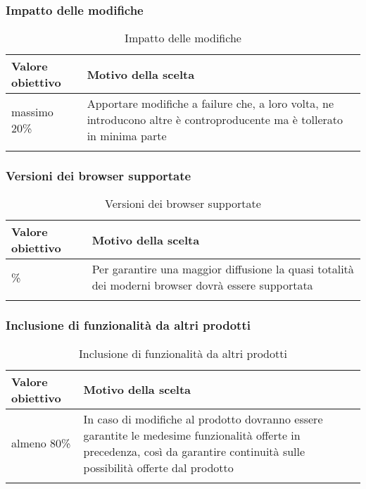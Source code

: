 \documentclass[../PianoDiQualifica_v4.0.0.tex]{subfiles}
\begin{document}
		\subsubsection{Impatto delle modifiche}
			\begin{longtable}[c] { >{\centering\arraybackslash}p{4cm} p{7cm} }
				\toprule
				\centerline{\textbf{Valore obiettivo}} & \centerline{\textbf{Motivo della scelta}} \\
				\midrule
					massimo 20\% & Apportare modifiche a failure che, a loro volta, ne introducono altre è controproducente ma è tollerato in minima parte \\
				\bottomrule
				\caption{Impatto delle modifiche}
			\end{longtable}

		\subsubsection{Versioni dei browser supportate}
			\begin{longtable}[c] { >{\centering\arraybackslash}p{4cm} p{7cm} }
				\toprule
				\centerline{\textbf{Valore obiettivo}} & \centerline{\textbf{Motivo della scelta}} \\
				\midrule
					95\% &	Per garantire una maggior diffusione la quasi totalità dei moderni browser dovrà essere supportata \\
				\bottomrule
				\caption{Versioni dei browser supportate}
			\end{longtable}

		\subsubsection{Inclusione di funzionalità da altri prodotti}
			\begin{longtable}[c] { >{\centering\arraybackslash}p{4cm} p{7cm} }
				\toprule
				\centerline{\textbf{Valore obiettivo}} & \centerline{\textbf{Motivo della scelta}} \\
				\midrule
					almeno 80\% & In caso di modifiche al prodotto dovranno essere garantite le medesime funzionalità  offerte in precedenza, così da garantire continuità sulle possibilità offerte dal prodotto \\
				\bottomrule
				\caption{Inclusione di funzionalità da altri prodotti}
			\end{longtable}
\end{document}
